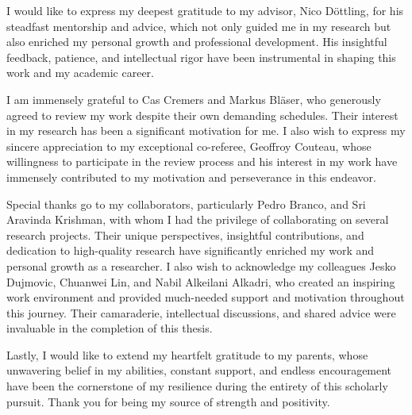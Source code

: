 
 I would like to express my deepest gratitude to my advisor, Nico D\"ottling, for his steadfast mentorship and advice, which not only guided me in my research but also enriched my personal growth and professional development. His insightful feedback, patience, and intellectual rigor have been instrumental in shaping this work and my academic career.

I am immensely grateful to Cas Cremers and Markus Bl\"aser, who generously agreed to review my work despite their own demanding schedules. Their interest in my research has been a significant motivation for me. 
I also wish to express my sincere appreciation to my exceptional co-referee, Geoffroy Couteau, whose willingness to participate in the review process and his interest in my work have immensely contributed to my motivation and perseverance in this endeavor. 

Special thanks go to my collaborators, particularly Pedro Branco, and Sri Aravinda Krishman, with whom I had the privilege of collaborating on several research projects. Their unique perspectives, insightful contributions, and dedication to high-quality research have significantly enriched my work and personal growth as a researcher.
I also wish to acknowledge my colleagues Jesko Dujmovic, Chuanwei Lin, and Nabil Alkeilani Alkadri, who created an inspiring work environment and provided much-needed support and motivation throughout this journey. Their camaraderie, intellectual discussions, and shared advice were invaluable in the completion of this thesis.

Lastly, I would like to extend my heartfelt gratitude to my parents, whose unwavering belief in my abilities, constant support, and endless encouragement have been the cornerstone of my resilience during the entirety of this scholarly pursuit. Thank you for being my source of strength and positivity.
